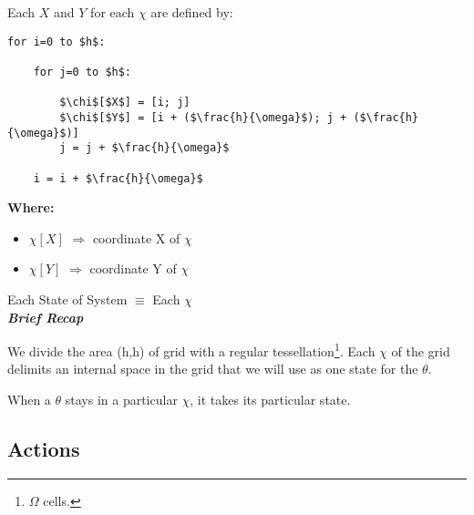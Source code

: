 \documentclass[12pt]{article}
\begin{document}
    
Each $X$ and $Y$ for each $\chi$ are defined by:


\begin{lstlisting}[style=CStyle, texcl=<true|false>, mathescape=true]
for i=0 to $h$:

    for j=0 to $h$:
    
        $\chi$[$X$] = [i; j]
        $\chi$[$Y$] = [i + ($\frac{h}{\omega}$); j + ($\frac{h}{\omega}$)]
        j = j + $\frac{h}{\omega}$
        
    i = i + $\frac{h}{\omega}$
\end{lstlisting}
    
\textbf{Where:}

\begin{itemize}

    \item $\chi[X]$ $\Rightarrow$ coordinate X of $\chi$

    \item $\chi[Y]$ $\Rightarrow$ coordinate Y of $\chi$

\end{itemize}

Each State of System $\equiv$ Each $\chi$ \\

\textit{\textbf{Brief Recap}}

We divide the area (h,h) of grid with a regular tessellation\footnote{$\Omega$ cells.}. Each $\chi$ of the grid delimits an internal space in the grid that we will use as one state for the $\theta$.

When a $\theta$ stays in a particular $\chi$, it takes its particular state.

\subsection{Actions}
\label{subsection:Actions}
\end{document}
